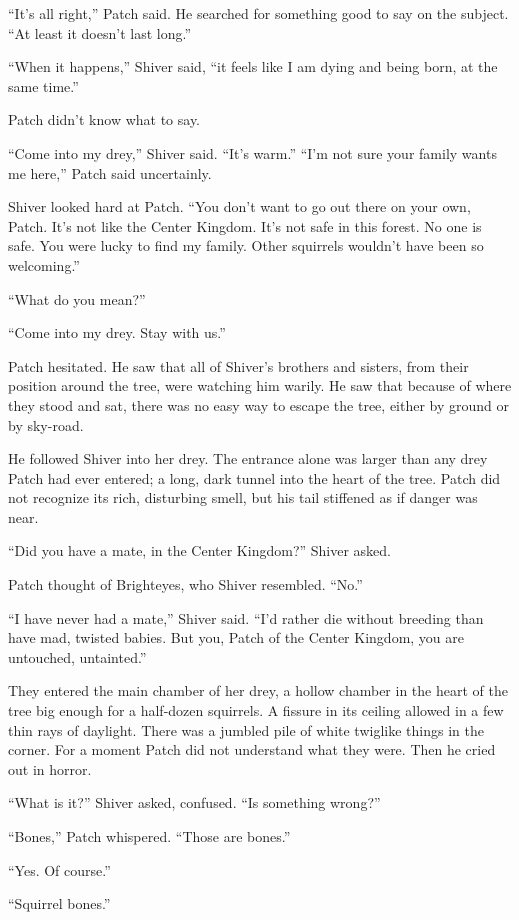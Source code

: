 \documentclass[12pt]{memoir}
\begin{document}
“It’s all right,” Patch said. He searched for something good to say on
the subject. “At least it doesn’t last long.”

“When it happens,” Shiver said, “it feels like I am dying and being
born, at the same time.”

Patch didn’t know what to say.

“Come into my drey,” Shiver said. “It’s warm.” “I’m not sure your
family wants me here,” Patch said uncertainly.

Shiver looked hard at Patch. “You don’t want to go out there on your
own, Patch. It’s not like the Center Kingdom. It’s not safe in this
forest. No one is safe. You were lucky to find my family. Other
squirrels wouldn’t have been so welcoming.”

“What do you mean?”

“Come into my drey. Stay with us.”

Patch hesitated. He saw that all of Shiver’s brothers and sisters,
from their position around the tree, were watching him warily. He saw
that because of where they stood and sat, there was no easy way to
escape the tree, either by ground or by sky-road.

He followed Shiver into her drey. The entrance alone was larger than
any drey Patch had ever entered; a long, dark tunnel into the heart of
the tree. Patch did not recognize its rich, disturbing smell, but his
tail stiffened as if danger was near.

“Did you have a mate, in the Center Kingdom?” Shiver asked.

Patch thought of Brighteyes, who Shiver resembled. “No.”

“I have never had a mate,” Shiver said. “I’d rather die without
breeding than have mad, twisted babies. But you, Patch of the Center
Kingdom, you are untouched, untainted.”

They entered the main chamber of her drey, a hollow chamber in the
heart of the tree big enough for a half-dozen squirrels. A fissure in
its ceiling allowed in a few thin rays of daylight. There was a
jumbled pile of white twiglike things in the corner. For a moment
Patch did not understand what they were. Then he cried out in horror.

“What is it?” Shiver asked, confused. “Is something wrong?”

“Bones,” Patch whispered. “Those are bones.”

“Yes. Of course.”

“Squirrel bones.”
\end{document}
